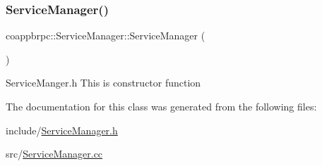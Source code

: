 \subsubsection{\texorpdfstring{Service\+Manager()}{ServiceManager()}}
{\footnotesize\ttfamily coappbrpc\+::\+Service\+Manager\+::\+Service\+Manager (\begin{DoxyParamCaption}{ }\end{DoxyParamCaption})}

Service\+Manger.\+h This is constructor function 

The documentation for this class was generated from the following files\+:\begin{DoxyCompactItemize}
\item 
include/\hyperlink{ServiceManager_8h}{Service\+Manager.\+h}\item 
src/\hyperlink{ServiceManager_8cc}{Service\+Manager.\+cc}\end{DoxyCompactItemize}

